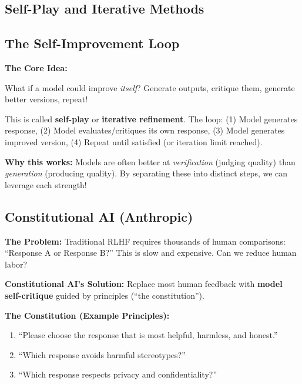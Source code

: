 \begin{chapterenv}

\chapter{Self-Play and Iterative Methods}

\section{The Self-Improvement Loop}

\begin{infobox}
\textbf{The Core Idea:}

What if a model could improve \textit{itself}? Generate outputs, critique them, generate better versions, repeat!

This is called \textbf{self-play} or \textbf{iterative refinement}. The loop: (1) Model generates response, (2) Model evaluates/critiques its own response, (3) Model generates improved version, (4) Repeat until satisfied (or iteration limit reached).

\textbf{Why this works:} Models are often better at \textit{verification} (judging quality) than \textit{generation} (producing quality). By separating these into distinct steps, we can leverage each strength!
\end{infobox}

\section{Constitutional AI (Anthropic)}

\textbf{The Problem:} Traditional RLHF requires thousands of human comparisons: ``Response A or Response B?'' This is slow and expensive. Can we reduce human labor?

\textbf{Constitutional AI's Solution:} Replace most human feedback with \textbf{model self-critique} guided by principles (``the constitution'').

\textbf{The Constitution (Example Principles):}
\begin{enumerate}[nosep]
    \item ``Please choose the response that is most helpful, harmless, and honest.''
    \item ``Which response avoids harmful stereotypes?''
    \item ``Which response respects privacy and confidentiality?''
\end{enumerate}


\end{chapterenv}
